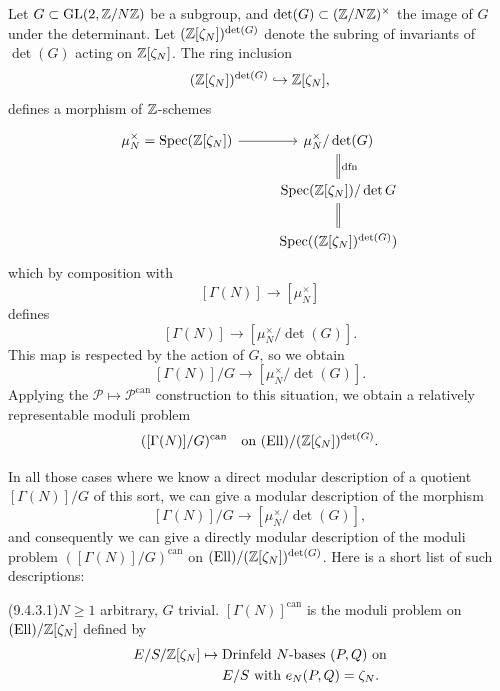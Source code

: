 \kmitem\label{item:9.4.2}
Let $G \subset \operatorname{GL}(2,\mathbb{Z}/N\mathbb{Z})$ be a subgroup, and $\det(G) \subset (\mathbb{Z}/N\mathbb{Z})^\times$ the image of $G$ under the determinant. Let $(\mathbb{Z}[\zeta_N])^{\det(G)}$ denote the subring of invariants of $\det(G)$ acting on $\mathbb{Z}[\zeta_N]$. The ring inclusion
\[
(\mathbb{Z}[\zeta_N])^{\det(G)} \hookrightarrow \mathbb{Z}[\zeta_N] ,
\]
defines a morphism of $\mathbb{Z}$-schemes
\[
\begin{tikzcd}[row sep=1.8em, column sep=2.5em]
\mu_N^\times = \Spec(\Z[\zeta_N]) \arrow[r] & \mu_N^\times/\det(G) \arrow[d, equal, "\mathrm{dfn}"] \\
& \Spec(\Z[\zeta_N])/\det G \arrow[d, equal] \\
& \Spec((\Z[\zeta_N])^{\det(G)})
\end{tikzcd}
\]
which by composition with
\[
[\Gamma(N)] \to [\mu_N^\times]
\]
defines
\[
[\Gamma(N)] \to [\mu_N^\times/\det(G)] .
\]
This map is respected by the action of $G$, so we obtain
\[
[\Gamma(N)]/G \to [\mu_N^\times/\det(G)] .
\]
Applying the $\mathcal{P} \mapsto \mathcal{P}^{\mathrm{can}}$ construction to this situation, we obtain a relatively representable moduli problem
\[
([\Gamma(N)]/G)^{\mathrm{can}} \quad\text{on } (\mathrm{Ell})/(\mathbb{Z}[\zeta_N])^{\det(G)} .
\]

\kmitem\label{item:9.4.3}
In all those cases where we know a direct modular description of a quotient $[\Gamma(N)]/G$ of this sort, we can give a modular description of the morphism
\[
[\Gamma(N)]/G \to [\mu_N^\times/\det(G)] ,
\]
and consequently we can give a directly modular description of the moduli problem $([\Gamma(N)]/G)^{\mathrm{can}}$ on $(\mathrm{Ell})/(\mathbb{Z}[\zeta_N])^{\det(G)}$. Here is a short list of such descriptions:

\par{}\noindent{}\label{item:9.4.3.1}(9.4.3.1)\enspace $N \ge 1$ arbitrary, $G$ trivial. $[\Gamma(N)]^{\mathrm{can}}$ is the moduli problem on $(\mathrm{Ell})/\mathbb{Z}[\zeta_N]$ defined by
\[
\begin{aligned}
E/S/\mathbb{Z}[\zeta_N] \mapsto {} & \text{Drinfeld $N$-bases } (P,Q) \text{ on} \\
& E/S \text{ with } e_N(P,Q) = \zeta_N .
\end{aligned}
\]


